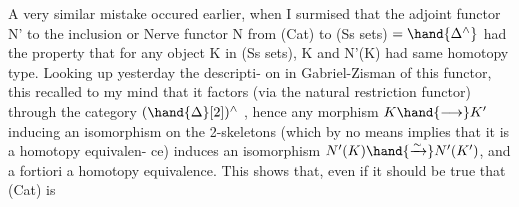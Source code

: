 A very similar mistake occured earlier, when I surmised that the 
adjoint functor N' to the inclusion or Nerve functor N from (Cat)
to (Ss sets) $=\hand{\Delta^{\wedge}}$ had the property that for any object K in (Ss sets),
K and N'(K) had same homotopy type. Looking up yesterday the descripti-%
on in Gabriel-Zisman of this functor, this recalled to my mind that
it factors (via the natural restriction functor) through the category
$(\hand{\Delta}[2])^{\wedge}$ , hence any morphism $K\hand{\longrightarrow}K'$ inducing an isomorphism on the
2-skeletons (which by no means implies that it is a homotopy equivalen-%
ce) induces an isomorphism $N'(K)\hand{\xrightarrow{\sim}}N'(K')$, and a fortiori a homotopy
equivalence. This shows that, even if it should be true that (Cat) is
